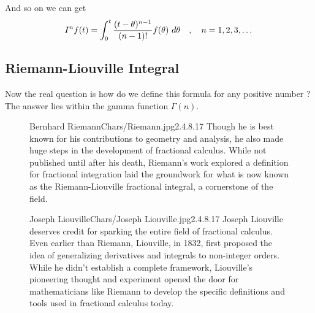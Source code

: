 \vspace*{.3cm}
And so on we can get 
\begin{equation}
    I^n f(t) = \int_{0}^{t} \frac{(t-\theta)^{n-1}}{(n-1)!}f(\theta) \,\, d\theta \quad , \quad n=1,2,3,\dots
\end{equation}
\subsection{Riemann-Liouville Integral}
Now the real question is how do we define this formula for any positive number ?
\\
The answer lies within the gamma function $\Gamma(n)$.
\begin{figure*}[b]
    \begin{minipage}[h]{\textwidth}
        \begin{enrichment}{Bernhard Riemann}{Chars/Riemann.jpg}{2.4}{.8}{.17}
            Though he is best known for his contributions to geometry and analysis, 
            he also made huge steps in the development of fractional calculus. 
            While not published until after his death, Riemann's work explored a definition for 
            fractional integration laid the groundwork for what is now known as the Riemann-Liouville 
            fractional integral, a cornerstone of the field.
        \end{enrichment} 
    \end{minipage}
\end{figure*}
\begin{figure*}[b]
    \begin{minipage}[h]{\textwidth}
        \begin{enrichment}{Joseph Liouville}{Chars/Joseph Liouville.jpg}{2.4}{.8}{.17}
            Joseph Liouville deserves credit for sparking the entire field of fractional calculus. 
            Even earlier than Riemann, Liouville, in 1832, first proposed the idea of generalizing 
            derivatives and integrals to non-integer orders. 
            While he didn't establish a complete framework, Liouville's pioneering thought and experiment 
            opened the door for mathematicians like Riemann to develop the specific definitions and tools used in fractional calculus today.
        \end{enrichment} 
    \end{minipage}
\end{figure*}


